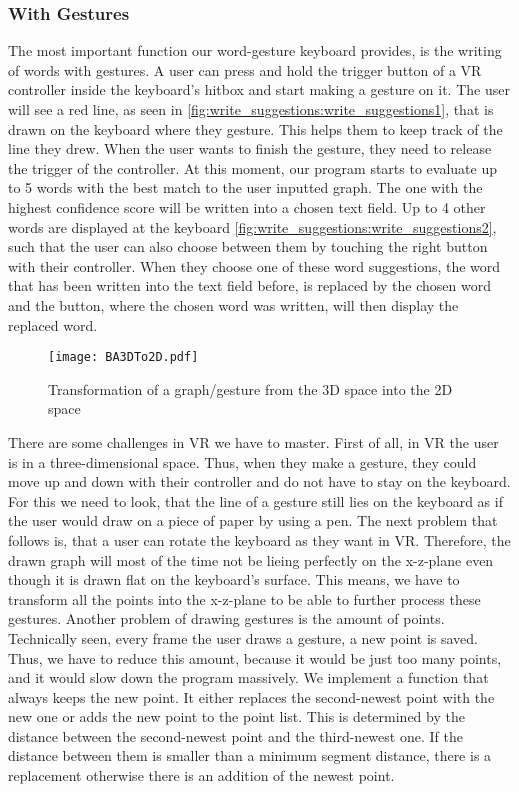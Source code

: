 \subsubsection{With Gestures}
The most important function our word-gesture keyboard provides, is the writing of words with gestures. A user can press and hold the trigger button of a VR controller inside the keyboard's hitbox and start making a gesture on it. The user will see a red line, as seen in \cref{fig:write_suggestions:write_suggestions1}, that is drawn on the keyboard where they gesture. This helps them to keep track of the line they drew. When the user wants to finish the gesture, they need to release the trigger of the controller. At this moment, our program starts to evaluate up to 5 words with the best match to the user inputted graph. The one with the highest confidence score will be written into a chosen text field. Up to 4 other words are displayed at the keyboard \cref{fig:write_suggestions:write_suggestions2}, such that the user can also choose between them by touching the right button with their controller. When they choose one of these word suggestions, the word that has been written into the text field before, is replaced by the chosen word and the button, where the chosen word was written, will then display the replaced word.\\
\begin{figure}[H]
    \centering
    \texttt{[image: BA3DTo2D.pdf]}
    \caption{Transformation of a graph/gesture from the 3D space into the 2D space}
    \label{fig:3DTo2D}
    \end{figure}
There are some challenges in VR we have to master. First of all, in VR the user is in a three-dimensional space. Thus, when they make a gesture, they could move up and down with their controller and do not have to stay on the keyboard. For this we need to look, that the line of a gesture still lies on the keyboard as if the user would draw on a piece of paper by using a pen. The next problem that follows is, that a user can rotate the keyboard as they want in VR. Therefore, the drawn graph will most of the time not be lieing perfectly on the x-z-plane even though it is drawn flat on the keyboard's surface. This means, we have to transform all the points into the x-z-plane to be able to further process these gestures. Another problem of drawing gestures is the amount of points. Technically seen, every frame the user draws a gesture, a new point is saved. Thus, we have to reduce this amount, because it would be just too many points, and it would slow down the program massively. We implement a function that always keeps the new point. It either replaces the second-newest point with the new one or adds the new point to the point list. This is determined by the distance between the second-newest point and the third-newest one. If the distance between them is smaller than a minimum segment distance, there is a replacement otherwise there is an addition of the newest point.

